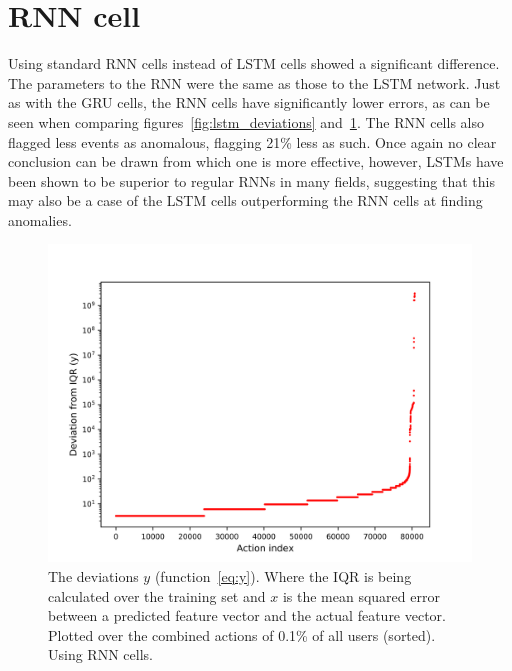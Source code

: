 
\section{RNN cell}
Using standard RNN cells instead of LSTM cells showed a significant difference. The parameters to the RNN were the same as those to the LSTM network. Just as with the GRU cells, the RNN cells have significantly lower errors, as can be seen when comparing figures~\ref{fig:lstm_deviations} and~\ref{fig:rnn_deviations}. The RNN cells also flagged less events as anomalous, flagging 21\% less as such. Once again no clear conclusion can be drawn from which one is more effective, however, LSTMs have been shown to be superior to regular RNNs in many fields, suggesting that this may also be a case of the LSTM cells outperforming the RNN cells at finding anomalies.

\begin{figure}
	\begin{center}
		\includegraphics[scale=6.0]{experiments/cell/deviations/rnn}
	\end{center}
	\caption{The deviations \(y\) (function~\ref{eq:y}). Where the IQR is being calculated over the training set and \(x\) is the mean squared error between a predicted feature vector and the actual feature vector. Plotted over the combined actions of 0.1\% of all users (sorted). Using RNN cells.~\label{fig:rnn_deviations}}
\end{figure}

